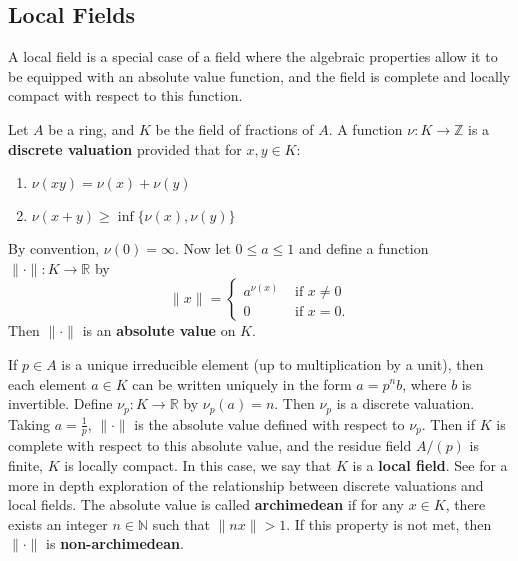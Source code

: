 \documentclass[11pt]{article}
\begin{document}
\subsection*{Local Fields}
A local field is a special case of a field where the algebraic properties allow it to be equipped with an absolute value function, and the field is complete and locally compact with respect to this function.
\begin{definition*}
Let $A$ be a ring, and $K$ be the field of fractions of $A$.
A function $\nu: K \to \mathbb{Z}$ is a \textbf{discrete valuation} provided that for $x, y \in K$:
\begin{enumerate}
\item $\nu(xy) = \nu(x) + \nu(y)$
\item $\nu(x + y) \ge \inf\{\nu(x), \nu(y)\}$
\end{enumerate}
By convention, $\nu(0) = \infty$.
Now let $0 \le a \le 1$ and define a function $\|\cdot \|: K \to \mathbb{R}$ by
\[
\|x\| = \begin{cases}
a^{\nu(x)} &\text{ if } x \ne 0\\
0 &\text{ if } x = 0.
\end{cases}
\]
Then $\| \cdot \|$ is an \textbf{absolute value} on $K$.

If $p \in A$ is a unique irreducible element (up to multiplication by a unit), then each element $a \in K$ 
can be written uniquely in the form $a = p^n b$, where $b$ is invertible.
Define $\nu_p: K \to \mathbb{R}$ by $\nu_p(a) = n$.
Then $\nu_p$ is a discrete valuation.
Taking $a = \frac{1}{p}$, $\| \cdot \|$ is the absolute value defined with respect to $\nu_p$.
Then if $K$ is complete with respect to this absolute value, and the residue field $A/(p)$ is finite, $K$ is locally compact.
In this case, we say that $K$ is a \textbf{local field}. 
See \citet{serre} for a more in depth exploration of the relationship between discrete valuations and local fields.
The absolute value is called \textbf{archimedean} if for any $x \in K$, there exists an integer $n \in \mathbb{N}$ such that 
$\|nx\| > 1$.
If this property is not met, then $\|\cdot \|$ is \textbf{non-archimedean}.
\end{definition*}
\newpage

\end{document}
